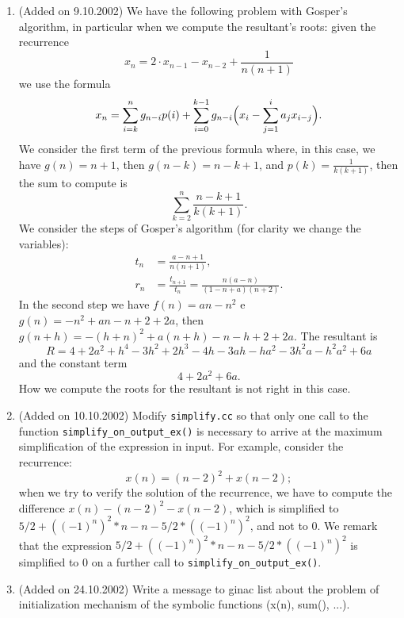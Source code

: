 \documentclass[a4paper]{article}
\begin{document}
\begin{enumerate}
\item (Added on 9.10.2002)
We have the following problem with Gosper's algorithm, in particular when
we compute the resultant's roots:
given the recurrence
\[
  x_n = 2 \cdot x_{n-1} - x_{n-2} + \frac1{n(n+1)}
\]
we use the formula 
\[
  x_n = \sum_{i=k}^n g_{n-i} p(i)
  +
  \sum_{i=0}^{k-1} g_{n-i} \Bigl( x_i - \sum_{j=1}^i a_j x_{i-j} \Bigr).
\]
We consider the first term of the previous formula where, in this case,
we have $g(n) = n + 1$, then $g(n-k) = n - k + 1$, and
$p(k) = \frac1{k(k+1)}$, then the sum to compute is
\[
  \sum_{k=2}^n \frac{n-k+1}{k(k+1)}.
\]
We consider the steps of Gosper's algorithm
(for clarity we change the variables):
\begin{align*}
  t_n &= \frac{a-n+1}{n(n+1)},\\
  r_n &= \frac{t_{n+1}}{t_n} = \frac{n(a-n)}{(1-n+a)(n+2)}.
\end{align*}
In the second step we have $f(n) = an - n^2$ e
$g(n) = -n^2 + an - n + 2 + 2a$, then
$g(n+h) = -(h+n)^2 + a(n+h) - n - h + 2 + 2a$.
The resultant is
\[
  R = 4 + 2a^2 + h^4 - 3h^2 + 2h^3 -4h -3ah - ha^2 -3h^2a -h^2a^2 + 6a
\]
and the constant term
\[
  4 + 2a^2 + 6a.
\]
How we compute the roots for the resultant is not right in this case.

\item (Added on 10.10.2002)
Modify \texttt{simplify.cc} so that only one call to the
function \texttt{simplify\_on\_output\_ex()} is necessary to arrive
at the maximum simplification of the expression in input. 
For example, consider the recurrence:
\[
  x(n) = (n-2)^2+x(n-2);
\]
when we try to verify the solution of the recurrence, we have to compute
the difference $x(n) - (n-2)^2 - x(n-2)$, which is simplified to  
$5/2+((-1)^n)^2*n-n-5/2*((-1)^n)^2$, and not to $0$.
We remark that the expression $5/2+((-1)^n)^2*n-n-5/2*((-1)^n)^2$ is
simplified to $0$ on a further call to \texttt{simplify\_on\_output\_ex()}.

\item (Added on 24.10.2002)
Write a message to ginac list about the problem of initialization mechanism
of the symbolic functions (x(n), sum(), ...). 


\end{enumerate}
\end{document}
